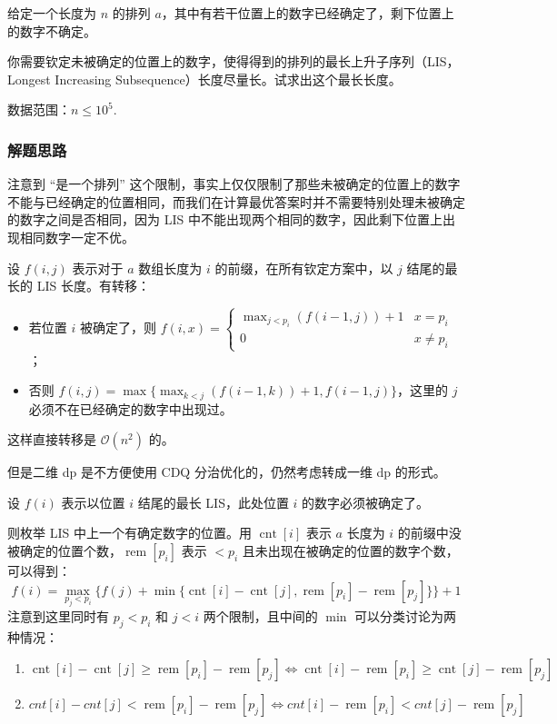 给定一个长度为 \(n\) 的排列
\(a\)，其中有若干位置上的数字已经确定了，剩下位置上的数字不确定。

你需要钦定未被确定的位置上的数字，使得得到的排列的最长上升子序列（LIS，Longest
Increasing Subsequence）长度尽量长。试求出这个最长长度。

数据范围：\(n\leq 10^5\).

\subsubsection{解题思路}

注意到 ``是一个排列''
这个限制，事实上仅仅限制了那些未被确定的位置上的数字不能与已经确定的位置相同，而我们在计算最优答案时并不需要特别处理未被确定的数字之间是否相同，因为
LIS 中不能出现两个相同的数字，因此剩下位置上出现相同数字一定不优。

设 \(f(i,j)\) 表示对于 \(a\) 数组长度为 \(i\)
的前缀，在所有钦定方案中，以 \(j\) 结尾的最长的 LIS 长度。有转移：

\begin{itemize}
\item
  若位置 \(i\) 被确定了，则
  \(f(i,x)=\begin{cases}\max_{j\lt p_i}(f(i-1,j))+1&x=p_i\\0&x\not=p_i\end{cases}\)；
\item
  否则 \(f(i,j)=\max\{\max_{k\lt j}(f(i-1,k))+1,f(i-1,j)\}\)，这里的
  \(j\) 必须不在已经确定的数字中出现过。
\end{itemize}

这样直接转移是 \(\mathcal{O}(n^2)\) 的。

但是二维 dp 是不方便使用 CDQ 分治优化的，仍然考虑转成一维 dp 的形式。

设 \(f(i)\) 表示以位置 \(i\) 结尾的最长 LIS，此处位置 \(i\)
的数字必须被确定了。

则枚举 LIS 中上一个有确定数字的位置。用 \(\operatorname{cnt}[i]\) 表示
\(a\) 长度为 \(i\)
的前缀中没被确定的位置个数，\(\operatorname{rem}[p_i]\) 表示 \(< p_i\)
且未出现在被确定的位置的数字个数，可以得到： \[
f(i)=\max_{p_j\lt p_i}\{f(j)+\min\{\operatorname{cnt}[i]-\operatorname{cnt}[j],\operatorname{rem}[p_i]-\operatorname{rem}[p_j]\}\}+1
\] 注意到这里同时有 \(p_j<p_i\) 和 \(j<i\) 两个限制，且中间的 \(\min\)
可以分类讨论为两种情况：

\begin{enumerate}
\def\labelenumi{\arabic{enumi}.}
\tightlist
\item
  \(\operatorname{cnt}[i]-\operatorname{cnt}[j]\geq\operatorname{rem}[p_i]-\operatorname{rem}[p_j] \iff \operatorname{cnt}[i]-\operatorname{rem}[p_i]\geq\operatorname{cnt}[j]-\operatorname{rem}[p_j]\)
\item
  \(cnt[i]-cnt[j]<\operatorname{rem}[p_i]-\operatorname{rem}[p_j] \iff cnt[i]-\operatorname{rem}[p_i]<cnt[j]-\operatorname{rem}[p_j]\)
\end{enumerate}

